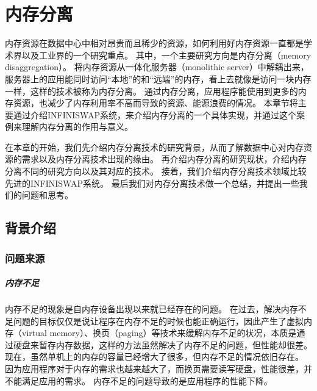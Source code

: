 
\chapter{内存分离} %

\label{Chapter2} %

%

内存资源在数据中心中相对昂贵而且稀少的资源，如何利用好内存资源一直都是学术界以及工业界的一个研究重点。
其中，一个主要研究方向是内存分离（memory disaggregation）。
将内存资源从一体化服务器（monolithic server）中解耦出来，服务器上的应用能同时访问“本地”的和“远端”的内存，看上去就像是访问一块内存一样，这样的技术被称为内存分离。
通过内存分离，应用程序能使用到更多的内存资源，也减少了内存利用率不高而导致的资源、能源浪费的情况。
本章节将主要通过介绍INFINISWAP系统，来介绍内存分离的一个具体实现，并通过这个案例来理解内存分离的作用与意义。

在本章的开始，我们先介绍内存分离技术的研究背景，从而了解数据中心对内存资源的需求以及内存分离技术出现的缘由。
再介绍内存分离的研究现状，介绍内存分离不同的研究方向以及其对应的技术。
接着，我们介绍内存分离技术领域比较先进的INFINISWAP系统\cite{gu2017efficient}。
最后我们对内存分离技术做一个总结，并提出一些我们的问题和思考。


\section{背景介绍}

\subsection{问题来源}
\paragraph{内存不足} 
内存不足的现象是自内存设备出现以来就已经存在的问题。
在过去，解决内存不足问题的目标仅仅是说让程序在内存不足的时候也能正确运行，因此产生了虚拟内存（virtual memory）、换页（paging）等技术来缓解内存不足的状况，本质是通过硬盘来暂存内存数据，这样的方法虽然解决了内存不足的问题，但性能却很差。
现在，虽然单机上的内存的容量已经增大了很多，但内存不足的情况依旧存在。
因为应用程序对于内存的需求也越来越大了，而换页需要读写硬盘，性能很差，并不能满足应用的需求。
内存不足的问题导致的是应用程序的性能下降。

